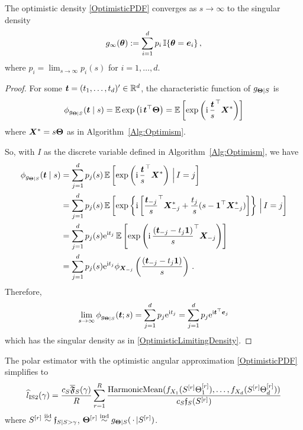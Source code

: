 \begin{proposition} \label{prop:optimistic_asymptotic}

The optimistic density \eqref{OptimisticPDF} converges as $s \to \infty$ to the singular density
\begin{equation} \label{OptimisticLimitingDensity}
g_\infty(\bm{\theta}) := \sum_{i=1}^{d} p_i \, \mathbb{I}\{  \bm{\theta} = \bm{e}_i  \} \,,
\end{equation}
where $p_i = \lim_{s\to\infty} p_i(s)$ for $i=1,\dots,d$.
\end{proposition}

\begin{proof}
For some $\bm{t}=(t_1,\dots,t_d)' \in \mathbb{R}^d$, the characteristic function of $g_{\bm{\Theta} \mid  S}$ is
\[
\phi_{g_{\bm{\Theta} \mid  S}}(\bm{t} \mid s)
= \operatorname{{\mathbb E}} \exp\left(\mathrm{i}\,\bm{t}^\top \bm{\Theta} \right)
= \operatorname{{\mathbb E}} \left[ \exp\left(\mathrm{i}\,\frac{\bm{t}}{s}^\top \bm{X}^* \right) \right]
\]
where $\bm{X}^* = s \bm{\Theta}$ as in Algorithm~\ref{Alg:Optimism}.

So, with $I$ as the discrete variable defined in Algorithm~\ref{Alg:Optimism}, we have
\begin{align*}
\phi_{g_{\bm{\Theta} \mid  S}}(\bm{t} \mid s)
&= \sum_{j=1}^d p_j(s) \operatorname{{\mathbb E}} \left[ \exp\left(\mathrm{i}\,\frac{\bm{t}}{s}^\top \bm{X}^* \right) \,\Big|\, I = j \right] \\
&= \sum_{j=1}^d p_j(s) \operatorname{{\mathbb E}} \left[ \exp \left\{ \mathrm{i} \left[ \frac{\bm{t}_{-j}}{s}^\top \bm{X}^*_{-j} + \frac{t_j}{s} (s - \bm{1}^\top \bm{X}^*_{-j}) \right] \right\}  \,\Big|\, I = j \right] \\
&= \sum_{j=1}^d p_j(s) \mathrm{e}^{\mathrm{i} t_j} \operatorname{{\mathbb E}} \left[ \exp\left(\mathrm{i}\,\frac{(\bm{t}_{-j} - t_j \bm{1})}{s}^\top \bm{X}_{-j} \right)  \right] \\
&= \sum_{j=1}^d p_j(s) \mathrm{e}^{\mathrm{i} t_j} \phi_{\bm{X}_{-j}} \left(  \frac{(\bm{t}_{-j} - t_j \bm{1})}{s} \right) \,.
\end{align*}
Therefore,
\[
\lim_{s \to \infty} \phi_{g_{\bm{\Theta} | S}}(\bm{t} ; s)
= \sum_{j=1}^d p_j \mathrm{e}^{\mathrm{i} t_j}
= \sum_{j=1}^d p_j \mathrm{e}^{\mathrm{i} \bm{t}^\top \bm{e}_j}
\]
which has the singular density as in \eqref{OptimisticLimitingDensity}.
\end{proof}

\begin{remark}
The polar estimator with the optimistic angular approximation \eqref{OptimisticPDF} simplifies to
\[
\widehat{l}_{\mathrm{IS2}}(\gamma)
= \frac{c_S \overline{\mathfrak{F}}_S(\gamma)}{R} \sum_{r=1}^R \frac{\mathrm{HarmonicMean}( f_{X_1}( S^{[r]} \Theta^{[r]}_1), \dots, f_{X_d}( S^{[r]} \Theta^{[r]}_d) )}{c_S \mathfrak{f}_S( S^{[r]} )}
\]
where $S^{[r]} \overset{\smash{\mathrm{iid}}}{\sim} \mathfrak{f}_{S|S>\gamma}$, $\bm{\Theta}^{[r]} \overset{\smash{\mathrm{ind}}}{\sim} g_{\bm{\Theta} \mid S}( \,\cdot\, | S^{[r]})$. \remQED
\end{remark}

